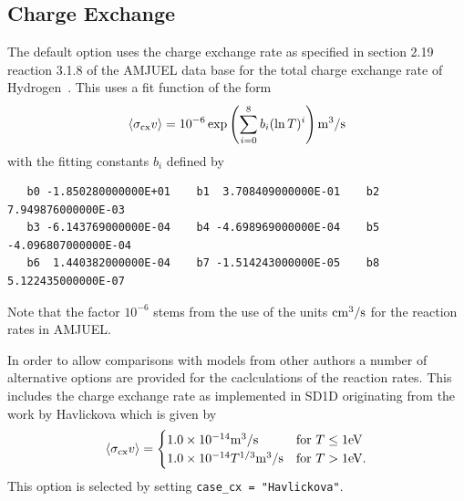 \documentclass[amsmath,amssymb,a4]{revtex4-2}
\begin{document}
\subsection{Charge Exchange}

The default option uses the charge exchange rate as specified in section 2.19 reaction 3.1.8 of the AMJUEL data base for the total charge exchange rate of Hydrogen~\cite{EIRENE}. This uses a fit function of the form
\begin{equation}\label{charge_exchange_AMJUEL}
    \langle\sigma_{\rm cx} v\rangle = 10^{-6} \exp\left( \sum_{i=0}^8 b_i (\ln T)^i \right)  {\rm m}^3/{\rm s}
\end{equation}
with the fitting constants $b_i$ defined by
\begin{small}\begin{verbatim}
   b0 -1.850280000000E+01    b1  3.708409000000E-01    b2  7.949876000000E-03
   b3 -6.143769000000E-04    b4 -4.698969000000E-04    b5 -4.096807000000E-04
   b6  1.440382000000E-04    b7 -1.514243000000E-05    b8  5.122435000000E-07
\end{verbatim}\end{small}
Note that the factor $10^{-6}$ stems from the use of the units ${\rm cm}^3/{\rm s}$ for the reaction rates in AMJUEL.

In order to allow comparisons with models from other authors a number of alternative options are provided for the caclculations of the reaction rates. This includes the charge exchange rate as implemented in SD1D originating from the work by Havlickova \cite{havlickova2013} which is given by \cite{SD1D}
\begin{equation}\label{charge_exchange_SD1D}
    \langle\sigma_{\rm cx} v\rangle = \begin{cases} 1.0 \times 10^{-14} {\rm m}^3/{\rm s}             & \mbox{for } T \le 1 {\rm eV} \\
                                        1.0 \times 10^{-14} T^{1/3} {\rm m}^3/{\rm s} & \mbox{for } T >   1 {\rm eV}. \end{cases}
\end{equation}
This option is selected by setting {\tt case\_cx = "Havlickova"}.
\end{document}
